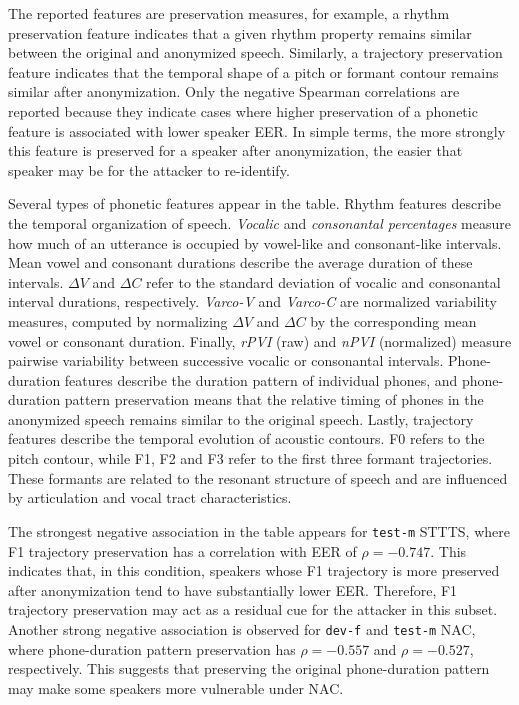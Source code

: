 \documentclass[12pt,leqno,a4paper]{article}
\begin{document}
The reported features are preservation measures, for example, a rhythm preservation feature indicates that a given rhythm property remains similar between the original and anonymized speech. Similarly, a trajectory preservation feature indicates that the temporal shape of a pitch or formant contour remains similar after anonymization. Only the negative Spearman correlations are reported because they indicate cases where higher preservation of a phonetic feature is associated with lower speaker EER. In simple terms, the more strongly this feature is preserved for a speaker after anonymization, the easier that speaker may be for the attacker to re-identify.

Several types of phonetic features appear in the table. Rhythm features describe the temporal organization of speech. \textit{Vocalic} and \textit{consonantal percentages} measure how much of an utterance is occupied by vowel-like and consonant-like intervals. Mean vowel and consonant durations describe the average duration of these intervals. $\Delta V$ and $\Delta C$ refer to the standard deviation of vocalic and consonantal interval durations, respectively. \textit{Varco-V} and \textit{Varco-C} are normalized variability measures, computed by normalizing $\Delta V$ and $\Delta C$ by the corresponding mean vowel or consonant duration. Finally, \textit{rPVI} (raw) and \textit{nPVI}  (normalized) measure pairwise variability between successive vocalic or consonantal intervals. Phone-duration features describe the duration pattern of individual phones, and phone-duration pattern preservation means that the relative timing of phones in the anonymized speech remains similar to the original speech. Lastly, trajectory features describe the temporal evolution of acoustic contours. F0 refers to the pitch contour, while F1, F2 and F3 refer to the first three formant trajectories. These formants are related to the resonant structure of speech and are influenced by articulation and vocal tract characteristics. 

The strongest negative association in the table appears for \texttt{test-m} STTTS, where F1 trajectory preservation has a correlation with EER of $\rho=-0.747$. This indicates that, in this condition, speakers whose F1 trajectory is more preserved after anonymization tend to have substantially lower EER. Therefore, F1 trajectory preservation may act as a residual cue for the attacker in this subset. Another strong negative association is observed for \texttt{dev-f} and \texttt{test-m} NAC, where phone-duration pattern preservation has $\rho=-0.557$ and $\rho=-0.527$, respectively. This suggests that preserving the original phone-duration pattern may make some speakers more vulnerable under NAC.
\end{document}
